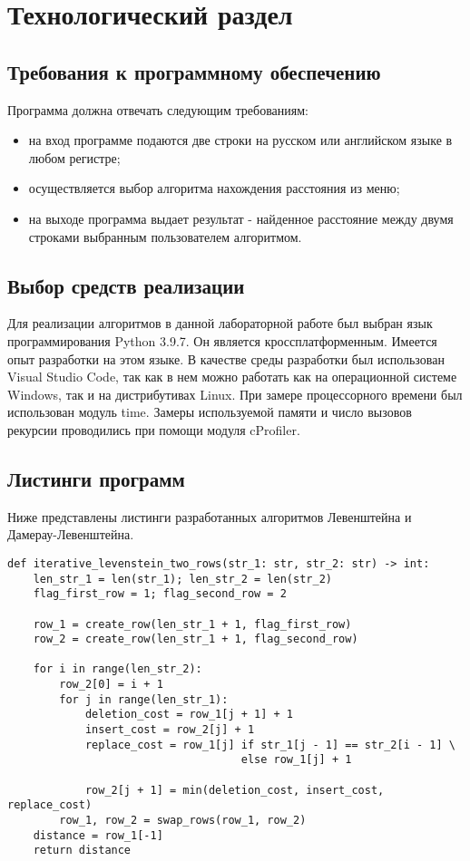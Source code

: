 \chapter{Технологический раздел}
\section{Требования к программному обеспечению}
Программа должна отвечать следующим требованиям:
\begin{itemize}
	\item на вход программе подаются две строки на русском или английском языке в любом регистре;
	\item осуществляется выбор алгоритма нахождения расстояния из меню;
	\item на выходе программа выдает результат - найденное расстояние между двумя строками выбранным пользователем алгоритмом.
\end{itemize}

\section{Выбор средств реализации}
Для реализации алгоритмов в данной лабораторной работе был выбран язык программирования Python 3.9.7\cite{python3}. Он является кроссплатформенным. Имеется опыт разработки на этом языке. В качестве среды разработки был использован Visual Studio Code\cite{vs}, так как в нем можно работать как на операционной системе Windows, так и на дистрибутивах Linux. При замере процессорного времени был использован модуль time\cite{time}. Замеры используемой памяти и число вызовов рекурсии проводились при помощи модуля cProfiler\cite{cprofile}.
\section{Листинги программ}
Ниже представлены листинги разработанных алгоритмов Левенштейна и Дамерау-Левенштейна.

\begin{lstlisting}[label=some-code,caption=Программный код нахождения расстояния Левенштейна итеративно с использованием двух строк]
def iterative_levenstein_two_rows(str_1: str, str_2: str) -> int:
	len_str_1 = len(str_1); len_str_2 = len(str_2)
	flag_first_row = 1; flag_second_row = 2
	
	row_1 = create_row(len_str_1 + 1, flag_first_row)
	row_2 = create_row(len_str_1 + 1, flag_second_row)
	
	for i in range(len_str_2):
		row_2[0] = i + 1
		for j in range(len_str_1):
			deletion_cost = row_1[j + 1] + 1
			insert_cost = row_2[j] + 1
			replace_cost = row_1[j] if str_1[j - 1] == str_2[i - 1] \
									else row_1[j] + 1
	
			row_2[j + 1] = min(deletion_cost, insert_cost, replace_cost)
		row_1, row_2 = swap_rows(row_1, row_2)
	distance = row_1[-1]
	return distance
\end{lstlisting}

